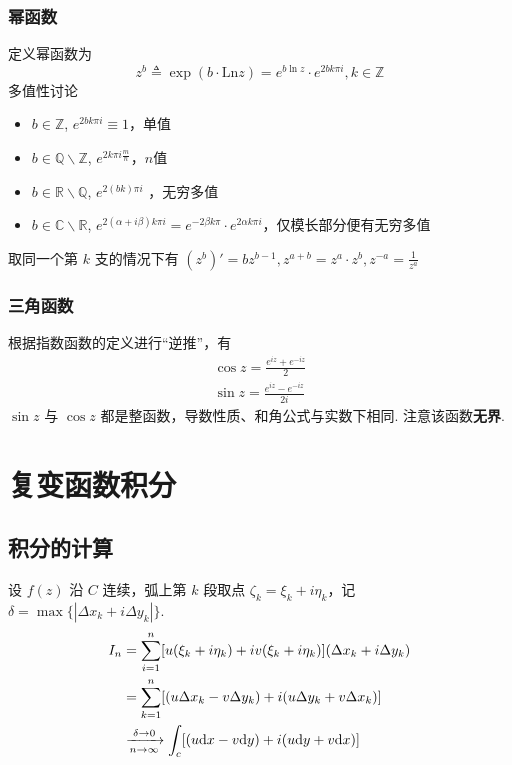 \documentclass[./main.tex]{subfiles}
\begin{document}
\subsubsection{幂函数}
定义幂函数为
\begin{equation}
    z^b\triangleq\exp(b\cdot\text{Ln}z)=e^{b\ln z}\cdot e^{2bk\pi i},k\in\mathbb{Z}
\end{equation}
多值性讨论
\begin{itemize}
    \item $b\in \mathbb{Z}$, $e^{2bk\pi i}\equiv 1$，单值
    \item $b\in \mathbb{Q}\backslash\mathbb{Z}$, $e^{2k\pi i\frac{m}{n}}$，$n$值
    \item $b\in \mathbb{R}\backslash\mathbb{Q}$, $e^{2(bk)\pi i}$ ，无穷多值
    \item $b\in \mathbb{C}\backslash\mathbb{R}$, $e^{2(\alpha+i\beta)k\pi i}=e^{-2\beta k\pi}\cdot e^{2\alpha k\pi i}$，仅模长部分便有无穷多值
\end{itemize}
取同一个第 $k$ 支的情况下有 $(z^b)'=bz^{b-1},z^{a+b}=z^a\cdot z^b,z^{-a}=\frac{1}{z^a}$
\subsubsection{三角函数}
根据指数函数的定义进行“逆推”，有
\begin{gather}
    \cos z=\frac{e^{iz}+e^{-iz}}{2}\\
    \sin z=\frac{e^{iz}-e^{-iz}}{2i}
\end{gather}
$\sin z$ 与 $\cos z$ 都是整函数，导数性质、和角公式与实数下相同. 注意该函数\textbf{无界}. 
\section{复变函数积分}
\subsection{积分的计算}
设 $f(z)$ 沿 $C$ 连续，弧上第 $k$ 段取点 $\zeta_k=\xi_k+i\eta_k$，记 $\delta=\max\{|\Delta x_k+i\Delta y_k|\}$. 
\begin{align}\label{int:calc}
    I_n&=\sum_{i=1}^{n}[u(\xi_k+i\eta_k)+iv(\xi_k+i\eta_k)](\Delta x_k+i\Delta y_k)\notag\\
    &=\sum_{k=1}^n[(u\Delta x_k-v\Delta y_k)+i(u\Delta y_k+v\Delta x_k)]\notag\\
    &\xrightarrow[n\rightarrow\infty]{\delta\rightarrow 0}\int_c[(u\text{d}x-v\text{d}y)+i(u\text{d}y+v\text{d}x)]
\end{align}
\end{document}
